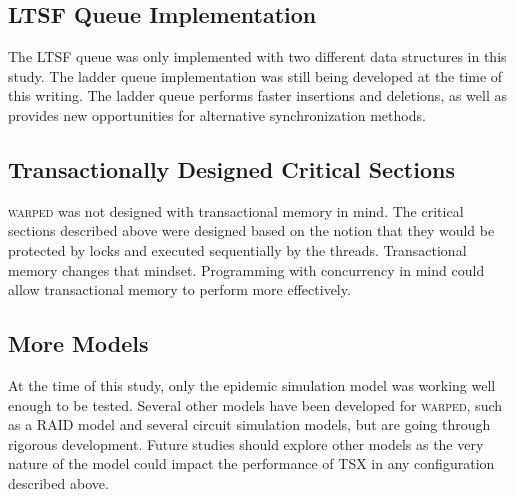 \documentclass[11pt]{book}
\begin{document}
\subsection{LTSF Queue Implementation}

The LTSF queue was only implemented with two different data structures in this
study.  The ladder queue implementation was still being developed at the time of
this writing.  The ladder queue performs faster insertions and deletions, as
well as provides new opportunities for alternative synchronization methods. 

\subsection{Transactionally Designed Critical Sections}

\textsc{warped} was not designed with transactional memory in mind.  The
critical sections described above were designed based on the notion that they
would be protected by locks and executed sequentially by the threads.
Transactional memory changes that mindset.  Programming with concurrency in mind
could allow transactional memory to perform more effectively.

\subsection{More Models}

At the time of this study, only the epidemic simulation model was working well
enough to be tested.  Several other models have been developed for
\textsc{warped}, such as a RAID model and several circuit simulation models, but
are going through rigorous development.  Future studies should explore other
models as the very nature of the model could impact the performance of TSX in
any configuration described above.

\newpage


\end{document}
